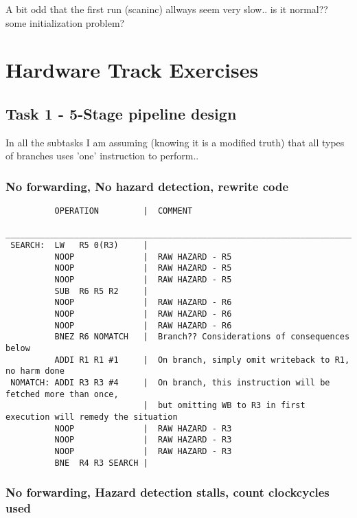 \documentclass[a4paper,10pt]{article}
\begin{document}
A bit odd that the first run (scaninc) allways seem very slow.. is it normal?? some initialization problem? 



\newpage

\section{Hardware Track Exercises}
\subsection{Task 1 - 5-Stage pipeline design}
In all the subtasks I am assuming (knowing it is a modified truth) that all types of branches uses 'one' instruction to perform..

\subsubsection{No forwarding, No hazard detection, rewrite code}
\begin{verbatim}
          OPERATION         |  COMMENT
 ________________________________________________________________________________________________
 SEARCH:  LW   R5 0(R3)     |
          NOOP              |  RAW HAZARD - R5
          NOOP              |  RAW HAZARD - R5
          NOOP              |  RAW HAZARD - R5
          SUB  R6 R5 R2     |
          NOOP              |  RAW HAZARD - R6
          NOOP              |  RAW HAZARD - R6
          NOOP              |  RAW HAZARD - R6
          BNEZ R6 NOMATCH   |  Branch?? Considerations of consequences below
          ADDI R1 R1 #1     |  On branch, simply omit writeback to R1, no harm done
 NOMATCH: ADDI R3 R3 #4     |  On branch, this instruction will be fetched more than once,
                            |  but omitting WB to R3 in first execution will remedy the situation
          NOOP              |  RAW HAZARD - R3
          NOOP              |  RAW HAZARD - R3
          NOOP              |  RAW HAZARD - R3
          BNE  R4 R3 SEARCH |
\end{verbatim}

\newpage
\subsubsection{No forwarding, Hazard detection stalls, count clockcycles used}
\end{document}

